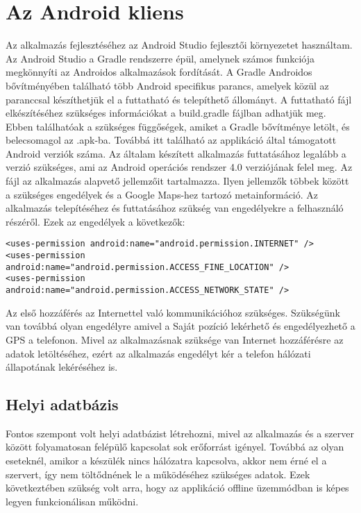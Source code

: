 \section{Az Android kliens}
\label{androidclient}
Az alkalmazás fejlesztéséhez az Android Studio fejlesztői környezetet használtam.
Az Android Studio a Gradle rendszerre épül, amelynek számos funkciója megkönnyíti az Androidos alkalmazások fordítását.
A Gradle Androidos bővítményében található több Android specifikus parancs, amelyek közül az  paranccsal készíthetjük el a futtatható és telepíthető állományt.
A futtatható fájl elkészítéséhez szükséges információkat a build.gradle fájlban adhatjük meg.
Ebben találhatóak a szükséges függőségek, amiket a Gradle bővítménye letölt, és belecsomagol az .apk-ba.
Továbbá itt található az applikáció által támogatott Android verziók száma.
Az általam készített alkalmazás futtatásához legalább a  verzió szükséges, ami az Android operációs rendszer 4.0 verziójának felel meg.
Az  fájl az alkalmazás alapvető jellemzőit tartalmazza.
Ilyen jellemzők többek között a szükséges engedélyek és a Google Maps-hez tartozó metainformáció.
Az alkalmazás telepítéséhez és futtatásához szükség van engedélyekre a felhasználó részéről.
Ezek az engedélyek a következők:
\begin{lstlisting}
<uses-permission android:name="android.permission.INTERNET" /> 
<uses-permission android:name="android.permission.ACCESS_FINE_LOCATION" />
<uses-permission android:name="android.permission.ACCESS_NETWORK_STATE" />
\end{lstlisting}

Az első hozzáférés az Internettel való kommunikációhoz szükséges.
Szükségünk van továbbá olyan engedélyre amivel a Saját pozíció lekérhető és engedélyezhető a GPS a telefonon.
Mivel az alkalmazásnak szüksége van Internet hozzáférésre az adatok letöltéséhez, ezért az alkalmazás engedélyt kér a telefon hálózati állapotának lekéréséhez is.

\subsection*{Helyi adatbázis}
\label{localdatabase}
Fontos szempont volt helyi adatbázist létrehozni, mivel az alkalmazás és a szerver között folyamatosan felépülő kapcsolat sok erőforrást igényel.
Továbbá az olyan eseteknél, amikor a készülék nincs hálózatra kapcsolva, akkor nem érné el a szervert, így nem töltődnének le a működéséhez szükséges adatok.
Ezek következtében szükség volt arra, hogy az applikáció offline üzemmódban is képes legyen funkcionálisan működni.


